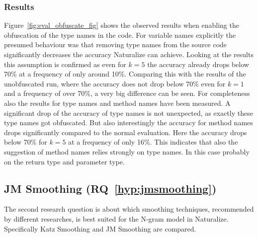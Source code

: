 \subsubsection{Results}
Figure~\ref{fig:eval_obfuscate_fig} shows the observed results when enabling the obfuscation of the type names in the code. For variable names explicitly the presumed behaviour was that removing type names from the source code significantly decreases the accuracy Naturalize can achieve. Looking at the results this assumption is confirmed as even for $k=5$ the accuracy already drops below 70\% at a frequency of only around 10\%. Comparing this with the results of the unobfuscated run, where the accuracy does not drop below 70\% even for $k=1$ and a frequency of over 70\%, a very big difference can be seen. For completeness also the results for type names and method names have been measured. A significant drop of the accuracy of type names is not unexpected, as exactly these type names got obfuscated. But also interestingly the accuracy for method names drops significantly compared to the normal evaluation. Here the accuracy drops below 70\% for $k=5$ at a frequency of only 16\%. This indicates that also the suggestion of method names relies strongly on type names. In this case probably on the return type and parameter type.
\noindent{}


\subsection{JM Smoothing (RQ~\ref{hyp:jmsmoothing})}

The second research question is about which smoothing techniques, recommended by different researches, is best suited for the N-gram model in Naturalize. Specifically Katz Smoothing and JM Smoothing are compared.

